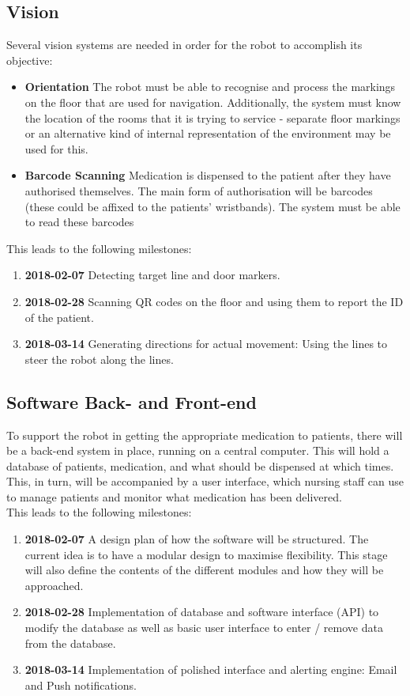 \documentclass[a4paper,10pt,DIV10,openright,openbib]{scrreprt}
\begin{document}
\subsection{Vision}
Several vision systems are needed in order for the robot to accomplish its objective:
\begin{itemize}
  \item \textbf{Orientation}
The robot must be able to recognise and process the markings on the floor that
are used for navigation. Additionally, the system must know the location of the rooms that
it is trying to service - separate floor markings or an alternative kind of
internal representation of the environment may be used for this.
  \item \textbf{Barcode Scanning}
Medication is dispensed to the patient after they have authorised themselves.
The main form of authorisation will be barcodes (these could be affixed to the
patients' wristbands). The system must be able to read these barcodes
\end{itemize}
This leads to the following milestones:
\begin{enumerate}
\item \textbf{2018-02-07} Detecting target line and door markers.
  \item \textbf{2018-02-28} Scanning QR codes on the floor and using them to
    report the ID of the patient.
  \item \textbf{2018-03-14} Generating directions for actual movement: Using the lines to steer the
    robot along the lines.
\end{enumerate}

\subsection{Software Back- and Front-end}
To support the robot in getting the appropriate medication to patients, there will
be a back-end system in place, running on a central computer. This will hold a 
database of patients, medication, and what should be dispensed at which times. This, in
turn, will be accompanied by a user interface, which nursing staff can use to manage patients
and monitor what medication has been delivered. \\
This leads to the following milestones:
\begin{enumerate}
  \item \textbf{2018-02-07} A design plan of how the software will be structured. The current idea is to have a 
  modular design to maximise flexibility. This stage will also define the contents of 
  the different modules and how they will be approached.
  \item \textbf{2018-02-28} Implementation of database and software interface
    (API) to modify the database as well as basic user interface to enter /
    remove data from the database.
\cbstart
  \item \textbf{2018-03-14} Implementation of polished interface and alerting
    engine: Email and Push notifications.
\end{enumerate}
\cbend
\end{document}
